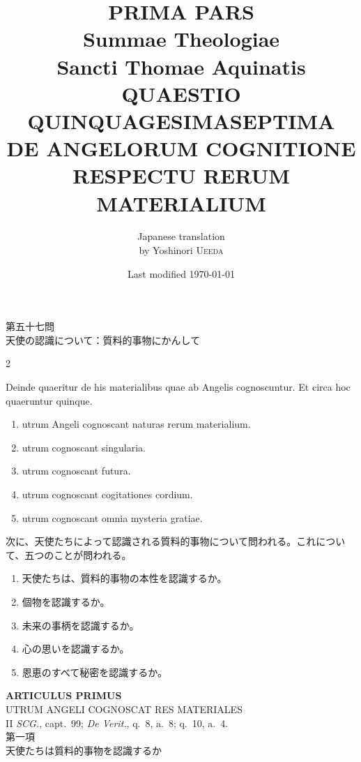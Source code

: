 \documentclass[paper=a4paper,fontsize=10pt,jafontsize=9pt,titlepage]{jlreq}
\title{{\bfseries PRIMA PARS}\\{\Huge Summae Theologiae}\\Sancti Thomae
Aquinatis\\{\sffamily QUAESTIO QUINQUAGESIMASEPTIMA}\\DE ANGELORUM COGNITIONE
 RESPECTU RERUM MATERIALIUM}
\author{Japanese translation\\by Yoshinori {\scshape Ueeda}}
\date{Last modified \today}
\begin{document}
\maketitle
\pagestyle{fancy}

\begin{center}
{\Large 第五十七問\\天使の認識について：質料的事物にかんして}
\end{center}

\begin{paracol}{2}

Deinde quaeritur de his materialibus quae ab Angelis cognoscuntur. Et
 circa hoc quaeruntur quinque.

\begin{enumerate}
 \item utrum Angeli cognoscant naturas rerum materialium.
 \item utrum cognoscant singularia.
 \item utrum cognoscant futura.
 \item utrum cognoscant cogitationes cordium.
 \item utrum cognoscant omnia mysteria gratiae.
\end{enumerate}

\switchcolumn

次に、天使たちによって認識される質料的事物について問われる。これについ
 て、五つのことが問われる。
 \begin{enumerate}
  \item 天使たちは、質料的事物の本性を認識するか。
  \item 個物を認識するか。
  \item 未来の事柄を認識するか。
  \item 心の思いを認識するか。
  \item 恩恵のすべて秘密を認識するか。
 \end{enumerate}

\end{paracol}
\newpage
{}
{}
\setcounter{section}{1}
\setcounter{subsection}{0}


\begin{center}
 {\Large {\bfseries ARTICULUS PRIMUS}}\\
 {\large UTRUM ANGELI COGNOSCAT RES MATERIALES}\\
 {\footnotesize II {\itshape SCG.}, capt.~99; {\itshape De Verit.},
 q.~8, a.~8; q.~10, a.~4.}\\
 {\Large 第一項\\天使たちは質料的事物を認識するか}
\end{center}
\end{document}
